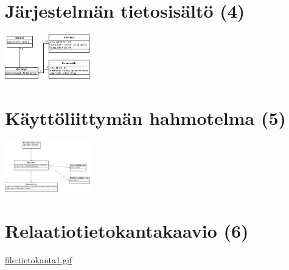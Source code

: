 \documentclass[11pt]{article}
\begin{document}
\section{Järjestelmän tietosisältö (4)}
\label{sec-4}

  \includegraphics[width=10em]{tietosisalto.jpeg}
\section{Käyttöliittymän hahmotelma (5)}
\label{sec-5}

   \includegraphics[width=10em]{sivukaavio.jpeg}
\section{Relaatiotietokantakaavio (6)}
\label{sec-6}

    \href{file:///home/jarmo/aktivatorPlus/docs/tietokanta1.gif}{file:tietokanta1.gif}
\end{document}

